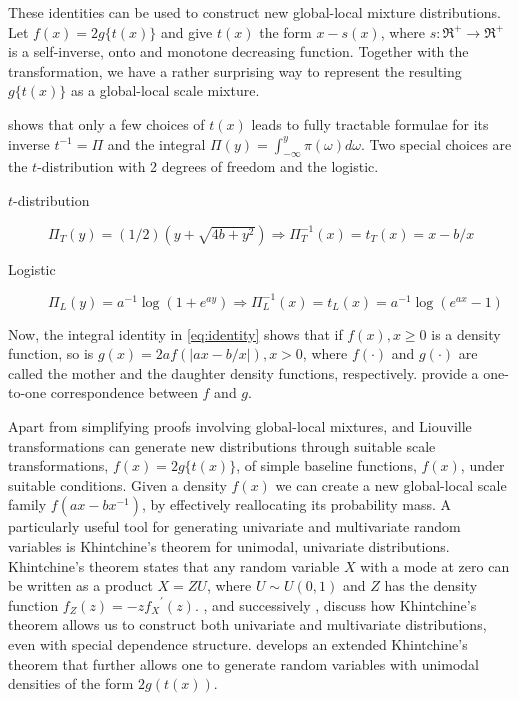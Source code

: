 \documentclass[lineno]{biometrika}
\begin{document}
These identities can be used to construct new global-local mixture distributions. 
Let $f(x) = 2g\{ t(x) \}$ and give $t(x)$ the form $x-s(x)$, where 
$s : \Re^+ \to \Re^+$ is a self-inverse, onto and monotone decreasing function. 
Together with the \CS{} transformation, we have a rather surprising way to
represent the resulting $g\{t(x)\}$ as a global-local scale mixture. 

\citet{jones_generating_2014} shows that only a few choices of $t(x)$ leads to fully tractable formulae for its inverse $t^{-1}= \Pi$ and the integral $\Pi(y) = \int_{-\infty}^{y} \pi(\omega) d\omega$. Two special choices are the $t$-distribution with 2 degrees of freedom and the logistic. 
\begin{description}
  \item[$t$-distribution] 
    $\Pi_{T}(y) = (1/2)(y+\sqrt{4b+y^2}) \Rightarrow \Pi_T^{-1}(x) = t_T(x) = x - b/x$ 
  \\
  \item[Logistic] 
    $\Pi_{L}(y) = a^{-1} \log(1+e^{ay}) \Rightarrow \Pi_L^{-1}(x) = t_L(x) = a^{-1} \log(e^{ax}-1)$
\end{description}

Now, the integral identity in \eqref{eq:identity} shows that if $f(x), x \geq 0$
is a density function, so is $g(x) = 2a f(|ax-b/x|), x >0$, where $f(\cdot)$ and
$g(\cdot)$ are called the mother and the daughter density functions, respectively.
\citet{chaubey2010reciprocal} provide a one-to-one correspondence between $f$
and $g$. 

Apart from simplifying proofs involving global-local mixtures, \CS{} and Liouville
transformations can generate new distributions through suitable scale
transformations, $f(x) = 2g\{ t(x) \}$, of simple baseline functions, $f(x)$, under
suitable conditions.  Given a density $f(x)$ we can create a new global-local
scale family $f(ax-bx^{-1})$, by effectively reallocating its probability mass.  A
particularly useful tool for generating univariate and multivariate random
variables is Khintchine's theorem for unimodal, univariate distributions.  
Khintchine's theorem states that any random variable $X$ with a mode at zero
can be written as a product $X = ZU$, where $U \sim U(0,1)$ and $Z$ has the
density function $f_Z(z) = -z {f_{X}}^{\prime}(z)$.
\citet{bryson1982constructing}, and successively \citet{jones2012khintchine},
discuss how Khintchine's theorem allows us to construct both univariate and
multivariate distributions, even with special dependence structure.
\cite{jones_generating_2014} develops an extended Khintchine's theorem that
further allows one to generate random variables with unimodal densities of the
form $2 g(t(x))$. 
\end{document}
